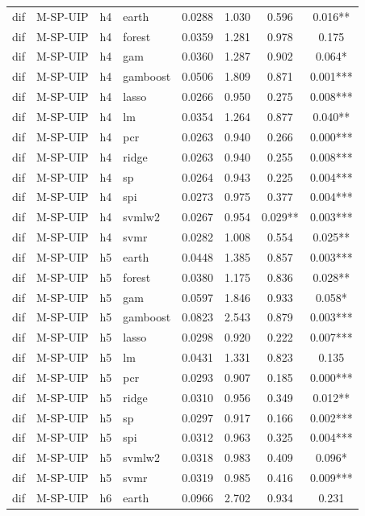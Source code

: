 \begin{ThreePartTable}
\begin{longtable}[t]{llclcccc}
\addlinespace
dif & M-SP-UIP & h4 & earth & 0.0288 & 1.030 & 0.596 & 0.016**\\
dif & M-SP-UIP & h4 & forest & 0.0359 & 1.281 & 0.978 & 0.175\\
dif & M-SP-UIP & h4 & gam & 0.0360 & 1.287 & 0.902 & 0.064*\\
dif & M-SP-UIP & h4 & gamboost & 0.0506 & 1.809 & 0.871 & 0.001***\\
dif & M-SP-UIP & h4 & lasso & 0.0266 & 0.950 & 0.275 & 0.008***\\
dif & M-SP-UIP & h4 & lm & 0.0354 & 1.264 & 0.877 & 0.040**\\
dif & M-SP-UIP & h4 & pcr & 0.0263 & 0.940 & 0.266 & 0.000***\\
dif & M-SP-UIP & h4 & ridge & 0.0263 & 0.940 & 0.255 & 0.008***\\
dif & M-SP-UIP & h4 & sp & 0.0264 & 0.943 & 0.225 & 0.004***\\
dif & M-SP-UIP & h4 & spi & 0.0273 & 0.975 & 0.377 & 0.004***\\
dif & M-SP-UIP & h4 & svmlw2 & 0.0267 & 0.954 & 0.029** & 0.003***\\
dif & M-SP-UIP & h4 & svmr & 0.0282 & 1.008 & 0.554 & 0.025**\\
\addlinespace
dif & M-SP-UIP & h5 & earth & 0.0448 & 1.385 & 0.857 & 0.003***\\
dif & M-SP-UIP & h5 & forest & 0.0380 & 1.175 & 0.836 & 0.028**\\
dif & M-SP-UIP & h5 & gam & 0.0597 & 1.846 & 0.933 & 0.058*\\
dif & M-SP-UIP & h5 & gamboost & 0.0823 & 2.543 & 0.879 & 0.003***\\
dif & M-SP-UIP & h5 & lasso & 0.0298 & 0.920 & 0.222 & 0.007***\\
dif & M-SP-UIP & h5 & lm & 0.0431 & 1.331 & 0.823 & 0.135\\
dif & M-SP-UIP & h5 & pcr & 0.0293 & 0.907 & 0.185 & 0.000***\\
dif & M-SP-UIP & h5 & ridge & 0.0310 & 0.956 & 0.349 & 0.012**\\
dif & M-SP-UIP & h5 & sp & 0.0297 & 0.917 & 0.166 & 0.002***\\
dif & M-SP-UIP & h5 & spi & 0.0312 & 0.963 & 0.325 & 0.004***\\
dif & M-SP-UIP & h5 & svmlw2 & 0.0318 & 0.983 & 0.409 & 0.096*\\
dif & M-SP-UIP & h5 & svmr & 0.0319 & 0.985 & 0.416 & 0.009***\\
\addlinespace
dif & M-SP-UIP & h6 & earth & 0.0966 & 2.702 & 0.934 & 0.231\\

\end{longtable}
\end{ThreePartTable}
